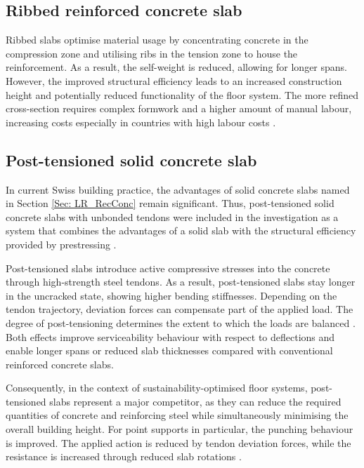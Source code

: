 \subsection{Ribbed reinforced concrete slab}
Ribbed slabs optimise material usage by concentrating concrete in the compression zone and utilising ribs in the tension zone to house the reinforcement. As a result, the self-weight is reduced, allowing for longer spans. However, the improved structural efficiency leads to an increased construction height and potentially reduced functionality of the floor system. The more refined cross-section requires complex formwork and a higher amount of manual labour, increasing costs especially in countries with high labour costs \cite{Ammann2024, Kaufmann2024_WhitePaper}.

\subsection{Post-tensioned solid concrete slab}
In current Swiss building practice, the advantages of solid concrete slabs named in Section \ref{Sec: LR_RecConc} remain significant.
Thus, post-tensioned solid concrete slabs with unbonded tendons were included in the investigation as a system that combines the advantages of a solid slab with the structural efficiency provided by prestressing \cite{Rombach2010}.

Post-tensioned slabs introduce active compressive stresses into the concrete through high-strength steel tendons. As a result, post-tensioned slabs stay longer in the uncracked state, showing higher bending stiffnesses. Depending on the tendon trajectory, deviation forces can compensate part of the applied load. The degree of post-tensioning determines the extent to which the loads are balanced \cite{Rombach2010, flachdecken_Morgen}.
Both effects improve serviceability behaviour with respect to deflections and enable longer spans or reduced slab thicknesses compared with conventional reinforced concrete slabs. 

Consequently, in the context of sustainability-optimised floor systems, post-tensioned slabs represent a major competitor, as they can reduce the required quantities of concrete and reinforcing steel while simultaneously minimising the overall building height. For point supports in particular, the punching behaviour is improved. The applied action is reduced by tendon deviation forces, while the resistance is increased through reduced slab rotations \cite{Rombach2010}.

